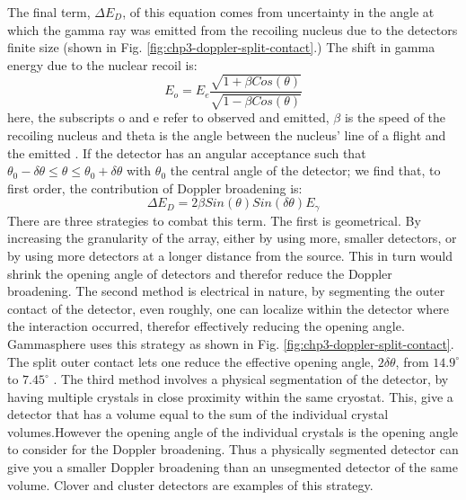 The final term, $\Delta{}E_{D}$, of this equation comes from uncertainty in the angle at which the gamma ray was emitted from the recoiling nucleus due to the detectors finite size (shown in Fig. \ref{fig:chp3-doppler-split-contact}.) The shift in gamma energy due to the nuclear recoil is:
\begin{equation}
\label{eqn:doppler_formula} 
E_{o} = E_{e}\frac{\sqrt{1+\beta{}Cos(\theta)}}{\sqrt{1-\beta{}Cos(\theta)}}
\end{equation}
here, the subscripts o and e refer to observed and emitted, $\beta$ is the speed of the recoiling nucleus and theta is the angle between the nucleus' line of a flight and the emitted \gr{}. If the detector has an angular acceptance such that $\theta{}_{0}-\delta{}\theta{}\leq{}\theta{}\leq{}\theta{}_{0}+\delta{}\theta{}$ with $\theta{}_{0}$ the central angle of the detector; we find that, to first order, the contribution of Doppler broadening is:
\begin{equation}
\label{eqn:res-doppler-term} 
\Delta{}E_{D} = 2\beta{}Sin(\theta{})Sin(\delta{}\theta{})E_{\gamma}
\end{equation}
There are three strategies to combat this term. The first is geometrical. By increasing the granularity of the array, either by using more, smaller detectors, or by using more detectors at a longer distance from the source. This in turn would shrink the opening angle of detectors and therefor reduce the Doppler broadening. The second method is electrical in nature, by segmenting the outer contact of the detector, even roughly, one can localize within the detector where the interaction occurred, therefor effectively reducing the opening angle. Gammasphere uses this strategy as shown in Fig. \ref{fig:chp3-doppler-split-contact}. The split outer contact lets one reduce the effective opening angle, $2\delta{}\theta{}$, from $14.9^{\circ}$ to $7.45^{\circ}$ \cite{TheGS}. The third method involves a physical segmentation of the detector, by having multiple crystals in close proximity within the same cryostat. This, give a detector that has a volume equal to the sum of the individual crystal volumes.However the opening angle of the individual crystals is the opening angle to consider for the Doppler broadening. Thus a physically segmented detector can give you a smaller Doppler broadening than an unsegmented detector of the same volume.  Clover and cluster detectors\cite{cloverDet,clusterDetector} are examples of this strategy.

